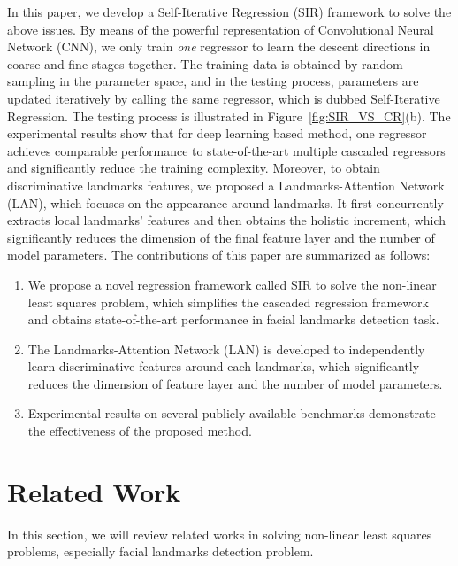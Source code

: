\documentclass[letterpaper]{article} \usepackage{aaai18}  \usepackage{times}  \usepackage{helvet}  \usepackage{courier}  \usepackage{url}  \usepackage{graphicx}
\begin{document}
In this paper, we develop a Self-Iterative Regression (SIR) framework to solve the above issues. By means of the powerful representation of Convolutional Neural Network (CNN), we only train \textit{one} regressor to learn the descent directions in coarse and fine stages together. The training data is obtained by random sampling in the parameter space, and in the testing process, parameters are updated iteratively by calling the same regressor, which is dubbed Self-Iterative Regression. The testing process is illustrated in Figure~\ref{fig:SIR_VS_CR}(b). The experimental results show that for deep learning based method, one regressor achieves comparable performance to state-of-the-art multiple cascaded regressors and significantly reduce the training complexity. Moreover, to obtain discriminative landmarks features, we proposed a Landmarks-Attention Network (LAN), which focuses on the appearance around landmarks. It first concurrently extracts local landmarks' features and then obtains the holistic increment, which significantly reduces the dimension of the final feature layer and the number of model parameters. The contributions of this paper are summarized as follows:
\begin{enumerate}
  \item We propose a novel regression framework called SIR to solve the non-linear least squares problem, which simplifies the cascaded regression framework and obtains state-of-the-art performance in facial landmarks detection task.
  \item The Landmarks-Attention Network (LAN) is developed to independently learn discriminative features around each landmarks, which significantly reduces the dimension of feature layer and the number of model parameters.
  \item Experimental results on several publicly available benchmarks demonstrate the effectiveness of the proposed method.
\end{enumerate}

\section{Related Work}\label{previous_works}
In this section, we will review related works in solving non-linear least squares problems, especially facial landmarks detection problem.
\end{document}
